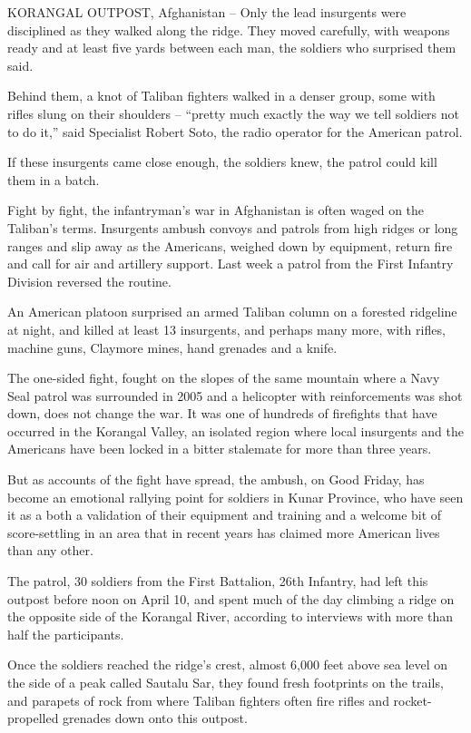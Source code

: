 \documentclass[12pt,a4paper,onecolumn]{article}
\begin{document}
KORANGAL OUTPOST, Afghanistan -- Only the lead insurgents were disciplined as they walked along the
ridge. They moved carefully, with weapons ready and at least five yards between each man, the
soldiers who surprised them said.

Behind them, a knot of Taliban fighters walked in a denser group, some with rifles slung on their
shoulders -- ``pretty much exactly the way we tell soldiers not to do it,'' said Specialist Robert
Soto, the radio operator for the American patrol.

If these insurgents came close enough, the soldiers knew, the patrol could kill them in a batch.

Fight by fight, the infantryman's war in Afghanistan is often waged on the Taliban's terms.
Insurgents ambush convoys and patrols from high ridges or long ranges and slip away as the
Americans, weighed down by equipment, return fire and call for air and artillery support. Last week
a patrol from the First Infantry Division reversed the routine.

An American platoon surprised an armed Taliban column on a forested ridgeline at night, and killed
at least 13 insurgents, and perhaps many more, with rifles, machine guns, Claymore mines, hand
grenades and a knife.

The one-sided fight, fought on the slopes of the same mountain where a Navy Seal patrol was
surrounded in 2005 and a helicopter with reinforcements was shot down, does not change the war. It
was one of hundreds of firefights that have occurred in the Korangal Valley, an isolated region
where local insurgents and the Americans have been locked in a bitter stalemate for more than three
years.

But as accounts of the fight have spread, the ambush, on Good Friday, has become an emotional
rallying point for soldiers in Kunar Province, who have seen it as a both a validation of their
equipment and training and a welcome bit of score-settling in an area that in recent years has
claimed more American lives than any other.

The patrol, 30 soldiers from the First Battalion, 26th Infantry, had left this outpost before noon
on April 10, and spent much of the day climbing a ridge on the opposite side of the Korangal River,
according to interviews with more than half the participants.

Once the soldiers reached the ridge's crest, almost 6,000 feet above sea level on the side of a peak
called Sautalu Sar, they found fresh footprints on the trails, and parapets of rock from where
Taliban fighters often fire rifles and rocket-propelled grenades down onto this outpost.
\end{document}
